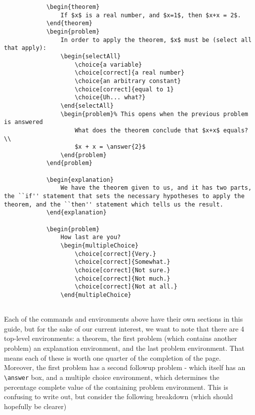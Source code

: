 \documentclass{ximera}
\begin{document}
        \begin{verbatim}
            \begin{theorem}
                If $x$ is a real number, and $x=1$, then $x+x = 2$.
            \end{theorem}
            \begin{problem}
                In order to apply the theorem, $x$ must be (select all that apply):
                \begin{selectAll}
                    \choice{a variable}
                    \choice[correct]{a real number}
                    \choice{an arbitrary constant}
                    \choice[correct]{equal to 1}
                    \choice{Uh... what?}
                \end{selectAll}
                \begin{problem}% This opens when the previous problem is answered
                    What does the theorem conclude that $x+x$ equals?\\
                    $x + x = \answer{2}$
                \end{problem}
            \end{problem}
            
            \begin{explanation}
                We have the theorem given to us, and it has two parts, the ``if'' statement that sets the necessary hypotheses to apply the theorem, and the ``then'' statement which tells us the result.
            \end{explanation}
            
            \begin{problem}
                How last are you?
                \begin{multipleChoice}
                    \choice[correct]{Very.}
                    \choice[correct]{Somewhat.}
                    \choice[correct]{Not sure.}
                    \choice[correct]{Not much.}
                    \choice[correct]{Not at all.}
                \end{multipleChoice}
        
        \end{verbatim}
        
        Each of the commands and environments above have their own sections in this guide, but for the sake of our current interest, we want to note that there are 4 top-level environments: a theorem, the first problem (which contains another problem) an explanation environment, and the last problem environment. That means each of these is worth one quarter of the completion of the page. Moreover, the first problem has a second followup problem - which itself has an \verb|\answer| box, and a multiple choice environment, which determines the percentage complete value of the containing problem environment. This is confusing to write out, but consider the following breakdown (which should hopefully be clearer)
        
\end{document}
